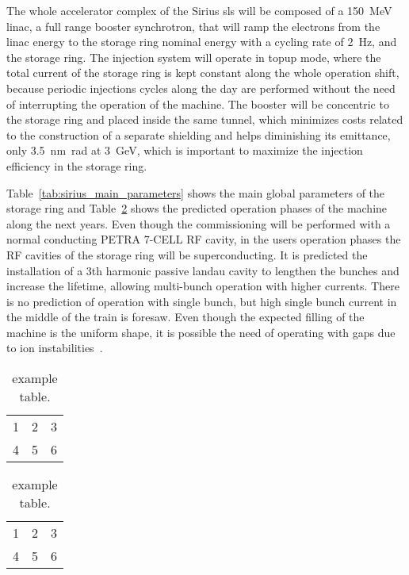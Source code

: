     The whole accelerator complex of the Sirius \gls{sls} will be composed of a \SI{150}{\mega\electronvolt} \gls{linac}, a full range booster synchrotron, that will ramp the electrons from the \gls{linac} energy to the storage ring nominal energy with a cycling rate of \SI{2}{\hertz}, and the storage ring. The injection system will operate in topup mode, where the total current of the storage ring is kept constant along the whole operation shift, because periodic injections cycles along the day are performed without the need of interrupting the operation of the machine. The booster will be concentric to the storage ring and placed inside the same tunnel, which minimizes costs related to the construction of a separate shielding and helps diminishing its emittance, only \SI{3.5}{\nano\meter\radian} at \SI{3}{\giga\electronvolt}, which is important to maximize the injection efficiency in the storage ring.

    Table~\ref{tab:sirius_main_parameters} shows the main global parameters of the storage ring and Table~\ref{tab:sirius_operation_phases} shows the predicted operation phases of the machine along the next years. Even though the commissioning will be performed with a normal conducting PETRA 7-CELL RF cavity, in the users operation phases the RF cavities of the storage ring will be superconducting. It is predicted the installation of a 3th harmonic passive landau cavity to lengthen the bunches and increase the lifetime, allowing multi-bunch operation with higher currents. There is no prediction of operation with single bunch, but high single bunch current in the middle of the train is foresaw. Even though the expected filling of the machine is the uniform shape, it is possible the need of operating with gaps due to ion instabilities~\cite{ioninstability}.

    \begin{table}[b]
        \caption{Main Parameters of the Sirius Storage Ring.}
        \begin{subtable}[h]{0.45\textwidth}
            \centering
            \caption{example table.}
            \label{tab:sirius_main_parameters}
            \begin{tabular}{c|c|c}
                1&2&3\\
                4&5&6
            \end{tabular}
        \end{subtable}
        \begin{subtable}[h]{0.45\textwidth}
            \centering
            \caption{example table.}
            \label{tab:sirius_operation_phases}
            \begin{tabular}{c|c|c}
                1&2&3\\
                4&5&6
            \end{tabular}
        \end{subtable}
    \end{table}

